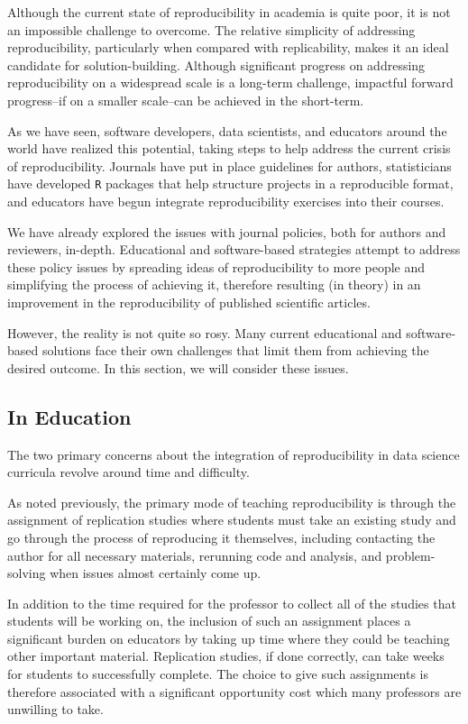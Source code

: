 \documentclass[12pt,twoside]{reedthesis}
\begin{document}
Although the current state of reproducibility in academia is quite poor, it is not an impossible challenge to overcome. The relative simplicity of addressing reproducibility, particularly when compared with replicability, makes it an ideal candidate for solution-building. Although significant progress on addressing reproducibility on a widespread scale is a long-term challenge, impactful forward progress--if on a smaller scale--can be achieved in the short-term.

As we have seen, software developers, data scientists, and educators around the world have realized this potential, taking steps to help address the current crisis of reproducibility. Journals have put in place guidelines for authors, statisticians have developed \texttt{R} packages that help structure projects in a reproducible format, and educators have begun integrate reproducibility exercises into their courses.

We have already explored the issues with journal policies, both for authors and reviewers, in-depth. Educational and software-based strategies attempt to address these policy issues by spreading ideas of reproducibility to more people and simplifying the process of achieving it, therefore resulting (in theory) in an improvement in the reproducibility of published scientific articles.

However, the reality is not quite so rosy. Many current educational and software-based solutions face their own challenges that limit them from achieving the desired outcome. In this section, we will consider these issues.

\hypertarget{in-education}{%
\subsection{In Education}\label{in-education}}

The two primary concerns about the integration of reproducibility in data science curricula revolve around time and difficulty.

As noted previously, the primary mode of teaching reproducibility is through the assignment of replication studies where students must take an existing study and go through the process of reproducing it themselves, including contacting the author for all necessary materials, rerunning code and analysis, and problem-solving when issues almost certainly come up.

In addition to the time required for the professor to collect all of the studies that students will be working on, the inclusion of such an assignment places a significant burden on educators by taking up time where they could be teaching other important material. Replication studies, if done correctly, can take weeks for students to successfully complete. The choice to give such assignments is therefore associated with a significant opportunity cost which many professors are unwilling to take.
\end{document}
